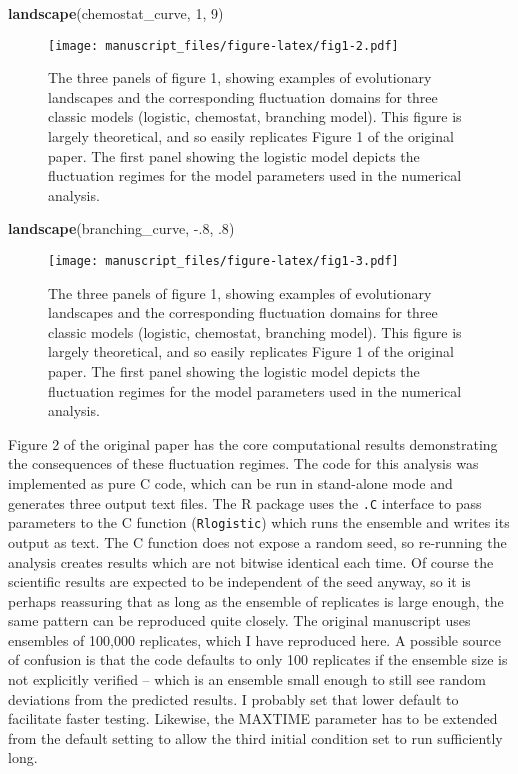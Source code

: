\documentclass[
]{rescience}
\newenvironment{Shaded}{\begin{snugshade}}{\end{snugshade}}
\newcommand{\DecValTok}[1]{\textcolor[rgb]{0.00,0.00,0.81}{#1}}
\newcommand{\FloatTok}[1]{\textcolor[rgb]{0.00,0.00,0.81}{#1}}
\newcommand{\KeywordTok}[1]{\textcolor[rgb]{0.13,0.29,0.53}{\textbf{#1}}}
\newcommand{\NormalTok}[1]{#1}
\begin{document}
\begin{Shaded}
\begin{Highlighting}[]
\KeywordTok{landscape}\NormalTok{(chemostat_curve, }\DecValTok{1}\NormalTok{, }\DecValTok{9}\NormalTok{)}
\end{Highlighting}
\end{Shaded}

\begin{figure}
\centering
\texttt{[image: manuscript\_files/figure-latex/fig1-2.pdf]}
\caption{The three panels of figure 1, showing examples of evolutionary
landscapes and the corresponding fluctuation domains for three classic
models (logistic, chemostat, branching model). This figure is largely
theoretical, and so easily replicates Figure 1 of the original paper.
The first panel showing the logistic model depicts the fluctuation
regimes for the model parameters used in the numerical analysis.}
\end{figure}

\begin{Shaded}
\begin{Highlighting}[]
\KeywordTok{landscape}\NormalTok{(branching_curve, }\FloatTok{-.8}\NormalTok{, }\FloatTok{.8}\NormalTok{)}
\end{Highlighting}
\end{Shaded}

\begin{figure}
\centering
\texttt{[image: manuscript\_files/figure-latex/fig1-3.pdf]}
\caption{The three panels of figure 1, showing examples of evolutionary
landscapes and the corresponding fluctuation domains for three classic
models (logistic, chemostat, branching model). This figure is largely
theoretical, and so easily replicates Figure 1 of the original paper.
The first panel showing the logistic model depicts the fluctuation
regimes for the model parameters used in the numerical analysis.}
\end{figure}

Figure 2 of the original paper has the core computational results
demonstrating the consequences of these fluctuation regimes. The code
for this analysis was implemented as pure C code, which can be run in
stand-alone mode and generates three output text files. The R package
uses the \texttt{.C} interface to pass parameters to the C function
(\texttt{Rlogistic}) which runs the ensemble and writes its output as
text. The C function does not expose a random seed, so re-running the
analysis creates results which are not bitwise identical each time. Of
course the scientific results are expected to be independent of the seed
anyway, so it is perhaps reassuring that as long as the ensemble of
replicates is large enough, the same pattern can be reproduced quite
closely. The original manuscript uses ensembles of 100,000 replicates,
which I have reproduced here. A possible source of confusion is that the
code defaults to only 100 replicates if the ensemble size is not
explicitly verified -- which is an ensemble small enough to still see
random deviations from the predicted results. I probably set that lower
default to facilitate faster testing. Likewise, the MAXTIME parameter
has to be extended from the default setting to allow the third initial
condition set to run sufficiently long.
\end{document}
